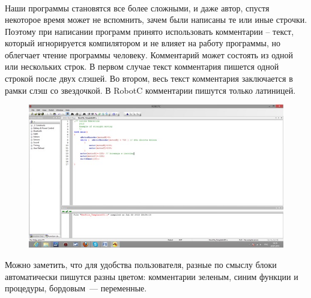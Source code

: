{\programm
	{\slshape{}}\rC{()}\\
	\rC{\{}\\
	\indent{}\\
	\\
	\indent\rC{\{}\\
	\indent\indent{}\\
	\indent\indent{}\\
	\indent\rC{\}}\\
	\indent{}\\
	\indent{}\\
	\indent{}\\
	\rC{\}}\\
}\\\\	

{\hypertarget{lesson10x5}{}}\\\\	

Наши программы становятся все более сложными, и даже автор, спустя некоторое время может не вспомнить, зачем были написаны те или иные строчки. Поэтому при написании программ принято использовать комментарии – текст, который игнорируется компилятором и не влияет на работу программы, но облегчает чтение программы человеку. Комментарий может состоять из одной или нескольких  строк. В первом случае текст комментария пишется одной строкой после двух слэшей. Во втором, весь текст комментария заключается в рамки слэш со звездочкой. В RobotC комментарии пишутся только латиницей.
\clearpage
\begin{figure}[h!]
	\begin{center}
		\includegraphics[width=1\linewidth]{chapters/chapter10/images/1}
		\caption{}
		\label{ris:image10x1}
	\end{center}
\end{figure}

Можно заметить, что для удобства пользователя, разные по смыслу блоки автоматически пишутся разны цветом: комментарии зеленым, синим функции и процедуры, бордовым~--- переменные.